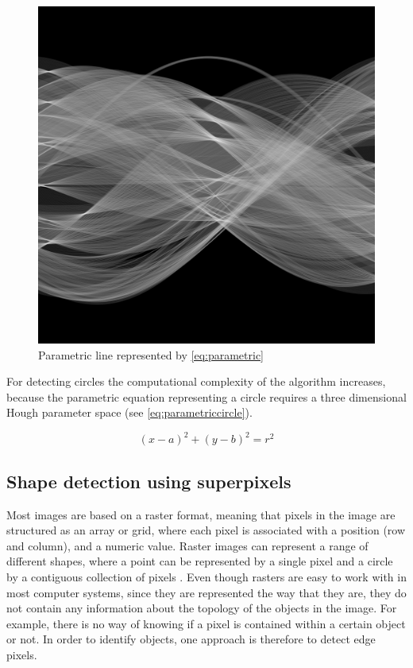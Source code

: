 \begin{figure}[!h]
	\centering
	\includegraphics[scale=0.2]{fig/hough_transform.png}
	\caption{Parametric line represented by \autoref{eq:parametric} \citep{Fisher2003}}
	\label{fig:parametricline}
\end{figure}

For detecting circles the computational complexity of the algorithm increases, because the parametric equation representing a circle requires a three dimensional Hough parameter space (see \autoref{eq:parametriccircle}).

\begin{equation}
	(x-a)^{2}+(y-b)^{2} = r^{2}
	\label{eq:parametriccircle}
\end{equation}

\subsection{Shape detection using superpixels}
Most images are based on a raster format, meaning that pixels in the image are structured as an array or grid, where each pixel is associated with a position (row and column), and a numeric value. Raster images can represent a range of different shapes, where a point can be represented by a single pixel and a circle by a contiguous collection of pixels \citep{Worboys2003}. Even though rasters are easy to work with in most computer systems, since they are represented the way that they are, they do not contain any information about the topology of the objects in the image. For example, there is no way of knowing if a pixel is contained within a certain object or not. In order to identify objects, one approach is therefore to detect edge pixels.

